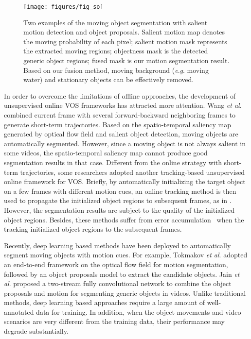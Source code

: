 \documentclass[journal]{IEEEtran}
\newcommand{\etal}{\textit{et al}. }
\newcommand{\eg}{\textit{e}.\textit{g}. }
\begin{document}
\begin{figure*}[!t]
	\centerline{\texttt{[image: figures/fig\_so]}}
	\caption{Two examples of the moving object segmentation with salient motion detection and object proposals. Salient motion map denotes the moving probability of each pixel; salient motion mask represents the extracted moving regions; objectness mask is the detected generic object regions; fused mask is our motion  segmentation result. Based on our fusion method, moving background (\eg moving water) and stationary objects can be effectively removed.}
\label{fig_so}
\end{figure*} 
In order to overcome the limitations of offline approaches,
the development of unsupervised online VOS frameworks has attracted more attention.
Wang \etal \cite{CVPR2015_Wang} combined current frame with several forward-backward neighboring frames to generate short-term trajectories.
Based on the spatio-temporal saliency map generated by optical flow field and salient object detection,
moving objects are automatically segmented. However, since a moving object is not always salient in some videos, the spatio-temporal saliency map cannot produce good segmentation results in that case. 
Different from the online strategy with short-term trajectories, 
some researchers adopted another tracking-based unsupervised online framework for VOS.
Briefly,
by automatically initializing the target object on a few frames with different motion cues, 
an online tracking method is then used to propagate the initialized object regions to subsequent frames, 
as in \cite{ICCV2013_Li,CVPR2015_Taylor,ICCV2015_Yang,ECCV2016_Bideau}.
However, the segmentation results are subject to the quality of the initialized object regions.
Besides, these methods suffer from error accumulation~\cite{CVPR2017_Khoreva} when the tracking initialized object regions to the subsequent frames.

Recently, deep learning based methods have been deployed to automatically segment moving objects with motion cues.
For example, Tokmakov \etal \cite{CVPR2017_Tokmakov} adopted an end-to-end framework on the optical flow field for motion segmentation, followed by an object proposals model \cite{ECCV2016_Pinheiro} to extract the candidate objects. Jain \etal \cite{CVPR2017_Jain} proposed a two-stream fully convolutional network to combine the object proposals and motion for segmenting generic objects in videos.
Unlike traditional methods, deep learning based approaches require a large amount of well-annotated data for training.
In addition, when the object movements and video scenarios are very different from the training data,
their performance may degrade substantially.
\end{document}
